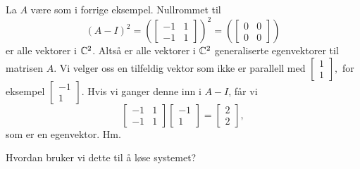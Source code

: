 \begin{ex}
La $A$ være som i forrige eksempel. Nullrommet til 
\[
(A-I)^2=
\left(\begin{bmatrix}
-1 & 1   \\
-1 & 1
\end{bmatrix}\right)^2=
\left(\begin{bmatrix}
0 & 0   \\
0 & 0
\end{bmatrix}\right)
\]
er alle vektorer i $\mathbb{C}^2$. Altså er alle vektorer i $\mathbb{C}^2$ 
generaliserte egenvektorer til matrisen $A$.
Vi velger oss en tilfeldig vektor som ikke er parallell med
$
\begin{bmatrix}
1  \\
1 
\end{bmatrix},
$
for eksempel
$
\begin{bmatrix}
-1  \\
1 
\end{bmatrix}.
$
Hvis vi ganger denne inn i $A-I$, får vi 
\[
\begin{bmatrix}
-1 & 1   \\
-1 & 1
\end{bmatrix}
\begin{bmatrix}
-1    \\
 1
\end{bmatrix}
=
\begin{bmatrix}
2    \\
2
\end{bmatrix},
\]
som er en egenvektor. Hm.
\end{ex}

Hvordan bruker vi dette til å løse systemet? 

